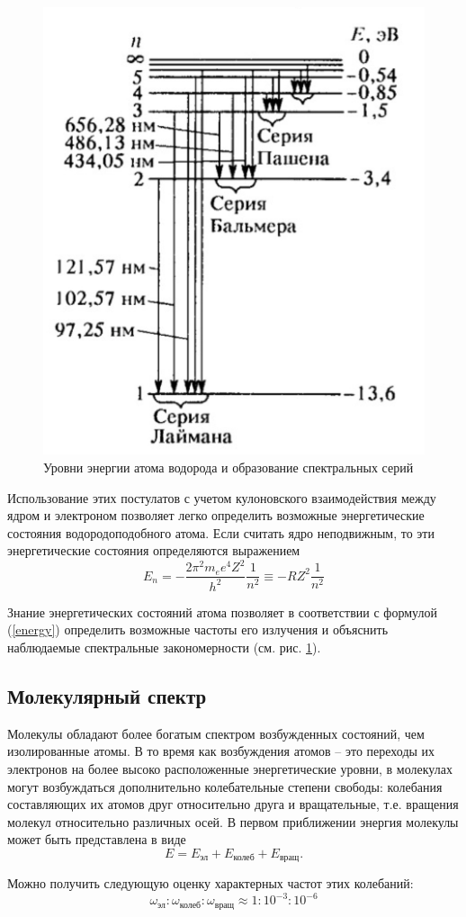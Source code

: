 \documentclass[a4paper,12pt]{article}
\begin{document}
	\begin{figure}[ht!]
		\label{series}
		\centering
		\includegraphics[width=.4\linewidth]{./img/series.png}
		\caption{Уровни энергии атома водорода и образование спектральных серий}
	\end{figure}
	
	Использование этих постулатов с учетом кулоновского взаимодействия между ядром и электроном позволяет легко определить возможные энергетические состояния водородоподобного атома. Если считать ядро неподвижным, то эти энергетические состояния определяются выражением 
	\begin{equation} \label{energy}
	E_n = - \frac{2 \pi^2 m_e e^4 Z^2}{h^2} \frac{1}{n^2} \equiv -RZ^2 \frac{1}{n^2}
	\end{equation}
	
	Знание энергетических состояний атома позволяет в соответствии с формулой (\ref{energy}) определить возможные частоты его излучения и объяснить наблюдаемые спектральные  закономерности (см. рис. \ref{series}). 
	
	\subsection{Молекулярный спектр}
	Молекулы обладают более богатым спектром возбужденных состояний, чем изолированные атомы. В то время как возбуждения атомов -- это переходы их электронов на более высоко расположенные энергетические уровни, в молекулах могут возбуждаться дополнительно колебательные степени свободы: колебания составляющих их атомов друг относительно друга и вращательные, т.е. вращения молекул относительно различных осей. В первом приближении энергия молекулы может быть представлена в виде 
	\begin{equation}
	E = E_\text{эл} + E_\text{колеб} + E_\text{вращ}.
	\end{equation}
	
	Можно получить следующую оценку характерных частот этих колебаний:
	\begin{equation}
	\omega_\text{эл} : \omega_\text{колеб} : \omega_\text{вращ} \approx 1 : 10^{-3} : 10^{-6}
	\end{equation}
	
\end{document}
